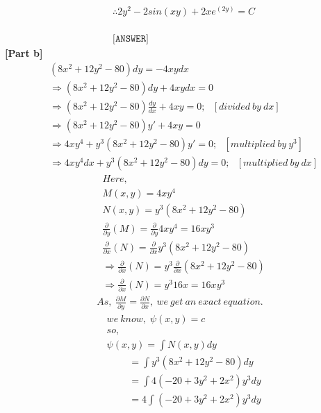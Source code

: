\documentclass{article}
\begin{document}
\begin{homeworkProblem}
\[\begin{split}
&\therefore 2y^2 - 2sin(xy)+2xe^(2y) = C
\\ \\ \\ \\ 
    &\texttt{[ANSWER]}
    \end{split}
    \]
\textbf{[Part b]}
       \begin{align*}
           & (8x^2 + 12y^2 -80)dy = -4xydx\\
& \Rightarrow (8x^2 + 12y^2 -80)dy + 4xydx=0\\
& \Rightarrow (8x^2 + 12y^2 -80)\frac{dy}{dx} + 4xy = 0;\:\:\:[divided\:by\:dx] \\
& \Rightarrow (8x^2 + 12y^2 -80)y' + 4xy = 0\\
&\Rightarrow 4xy^4 + y^3(8x^2+12y^2-80)y' = 0 ;\:\:\:[multiplied\: by\: y^3]\\
&\Rightarrow 4xy^4dx + y^3(8x^2+12y^2-80)dy = 0;\:\:\:[multiplied\: by\: dx]
       \end{align*}
       \begin{align*}
           & Here,\\
           & M(x,y) = 4xy^4\\
           & N(x,y) = y^3(8x^2+12y^2-80)\\
           & \frac{\partial }{\partial y}(M) = \frac{\partial }{\partial y}4xy^4 = 16xy^3\\
& \frac{\partial}{\partial x}(N) = \frac{\partial }{\partial x} y^3 (8x^2 + 12y^2 - 80)\\
& \Rightarrow \frac{\partial }{\partial x}(N) =
y^3 \frac{\partial }{\partial x}(8x^2 + 12y^2-80)\\
& \Rightarrow\frac{\partial }{\partial x}(N) = y^3 16x = 16xy^3
       \end{align*}
      \begin{align*}
          As,\: \frac{\partial M }{\partial y} = \frac{\partial N}{\partial x},\: we\:get\:an\:exact\:equation.
      \end{align*}
      \begin{align*}
          & we\: know,\; \psi (x,y)= c\\
& so,\\
& \psi (x,y) = \int N(x,y)dy\\
& \;\:\:\:\:\:\:\:\:\:= \int y^3 (8x^2 +12y^2 -80)dy\\
& \;\:\:\:\:\:\:\:\:\: = \int 4(-20+3y^2 + 2x^2)y^3 dy\\
& \;\:\:\:\:\:\:\:\:\: = 4 \int (-20+3y^2+2x^2)y^3 dy\\

\end{align*}
\end{homeworkProblem}
\end{document}
